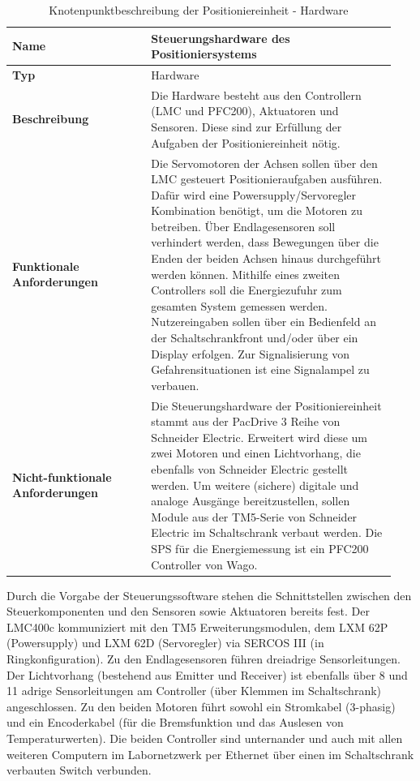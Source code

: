 \documentclass[../../../Bachelorarbeit.tex]{subfiles}
\begin{document}
\begin{table}[H]
    \centering
    \begin{tabular}{| p{0.34\linewidth} | p{0.6\linewidth} |}
        \hline
        \textbf{Name} & Steuerungshardware des Positioniersystems \\ \hline
        \textbf{Typ} & Hardware \\ \hline
        \textbf{Beschreibung} & Die Hardware besteht aus den Controllern (LMC und PFC200), Aktuatoren und Sensoren. Diese sind zur Erfüllung der Aufgaben der Positioniereinheit nötig. \\ \hline
        \textbf{Funktionale Anforderungen} & Die Servomotoren der Achsen sollen über den LMC gesteuert Positionieraufgaben ausführen. Dafür wird eine Powersupply/Servoregler Kombination benötigt, um die Motoren zu betreiben. Über Endlagesensoren soll verhindert werden, dass Bewegungen über die Enden der beiden Achsen hinaus durchgeführt werden können. Mithilfe eines zweiten Controllers soll die Energiezufuhr zum gesamten System gemessen werden. Nutzereingaben sollen über ein Bedienfeld an der Schaltschrankfront und/oder über ein Display erfolgen. Zur Signalisierung von Gefahrensituationen ist eine Signalampel zu verbauen. \\ \hline
        \textbf{Nicht-funktionale Anforderungen} & Die Steuerungshardware der Positioniereinheit stammt aus der PacDrive 3 Reihe von Schneider Electric. Erweitert wird diese um zwei Motoren und einen Lichtvorhang, die ebenfalls von Schneider Electric gestellt werden. Um weitere (sichere) digitale und analoge Ausgänge bereitzustellen, sollen Module aus der TM5-Serie von Schneider Electric im Schaltschrank verbaut werden. Die SPS für die Energiemessung ist ein PFC200 Controller von Wago. \\ \hline
    \end{tabular}
    \caption[Knotenpunktbeschreibung - Hardware]{Knotenpunktbeschreibung der Positioniereinheit - Hardware}
    \label{tab:my-table51}
\end{table}

Durch die Vorgabe der Steuerungssoftware stehen die Schnittstellen zwischen den Steuerkomponenten und den Sensoren sowie Aktuatoren bereits fest. Der LMC400c kommuniziert mit den TM5 Erweiterungsmodulen, dem LXM 62P (Powersupply) und LXM 62D (Servoregler) via SERCOS III (in Ringkonfiguration). Zu den Endlagesensoren führen dreiadrige Sensorleitungen. Der Lichtvorhang (bestehend aus Emitter und Receiver) ist ebenfalls über 8 und 11 adrige Sensorleitungen am Controller (über Klemmen im Schaltschrank) angeschlossen. Zu den beiden Motoren führt sowohl ein Stromkabel (3-phasig) und ein Encoderkabel (für die Bremsfunktion und das Auslesen von \zB Temperaturwerten). Die beiden Controller sind unternander und auch mit allen weiteren Computern im Labornetzwerk per Ethernet über einen im Schaltschrank verbauten Switch verbunden.
\end{document}
